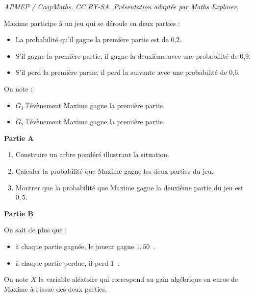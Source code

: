 \documentclass[10pt]{article}
\providecommand{\euro}{\texteuro}
\providecommand{\euro}{{\text{€}}}
\renewcommand{\euro}{\ifmmode\text{\texteuro}\else\texteuro\fi}
\begin{document}
\noindent\textit{APMEP / CoopMaths. CC BY-SA. Présentation adaptée par Maths Explorer.}\par\medskip
\medskip

Maxime participe à un jeu qui se déroule en deux parties :
\begin{itemize}
\item La probabilité qu'il gagne la première partie est de 0,2.
\item S'il gagne la première partie, il gagne la deuxième avec une probabilité de 0,9. 
\item S'il perd la première partie, il perd la suivante avec une probabilité de 0,6.
\end{itemize}

On note :
\begin{itemize}[label=\textbullet]
\item $G_1$ l'évènement \og Maxime gagne la première partie \fg
\item $G_2$ l'évènement \og Maxime gagne la première partie \fg
\end{itemize}

\bigskip

\textbf{Partie A}

\medskip

\begin{enumerate}
\item Construire un arbre pondéré illustrant la situation.
\item Calculer la probabilité que Maxime gagne les deux parties du jeu.
\item Montrer que la probabilité que Maxime gagne la deuxième partie du jeu est $0,5$.
\end{enumerate}

\bigskip

\textbf{Partie B}

\medskip

On sait de plus que :

\begin{itemize}
\item à chaque partie gagnée, le joueur gagne $1,50$~\euro.
\item à chaque partie perdue, il perd $1$~\euro.
\end{itemize}

\smallskip

On note $X$ la variable aléatoire qui correspond au gain algébrique en euros de Maxime
à l'issue des deux parties.

\medskip
\end{document}
